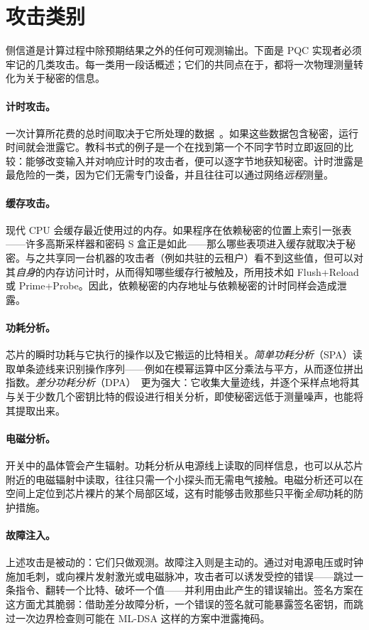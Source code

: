 \section{攻击类别}

侧信道是计算过程中除预期结果之外的任何可观测输出。下面是 PQC 实现者必须牢记的几类攻击。每一类用一段话概述；它们的共同点在于，都将一次物理测量转化为关于秘密的信息。

\paragraph{计时攻击。}
一次计算所花费的总时间取决于它所处理的数据~\cite{kocher1996}。如果这些数据包含秘密，运行时间就会泄露它。教科书式的例子是一个在找到第一个不同字节时立即返回的比较：能够改变输入并对响应计时的攻击者，便可以逐字节地获知秘密。计时泄露是最危险的一类，因为它们无需专门设备，并且往往可以通过网络\emph{远程}测量。

\paragraph{缓存攻击。}
现代 CPU 会缓存最近使用过的内存。如果程序在依赖秘密的位置上索引一张表——许多高斯采样器和密码 S 盒正是如此——那么哪些表项进入缓存就取决于秘密。与之共享同一台机器的攻击者（例如共驻的云租户）看不到这些值，但可以对其\emph{自身}的内存访问计时，从而得知哪些缓存行被触及，所用技术如 Flush+Reload 或 Prime+Probe。因此，依赖秘密的内存地址与依赖秘密的计时同样会造成泄露。

\paragraph{功耗分析。}
芯片的瞬时功耗与它执行的操作以及它搬运的比特相关。\emph{简单功耗分析}（SPA）读取单条迹线来识别操作序列——例如在模幂运算中区分乘法与平方，从而逐位拼出指数。\emph{差分功耗分析}（DPA）~\cite{kjj1999}更为强大：它收集大量迹线，并逐个采样点地将其与关于少数几个密钥比特的假设进行相关分析，即使秘密远低于测量噪声，也能将其提取出来。

\paragraph{电磁分析。}
开关中的晶体管会产生辐射。功耗分析从电源线上读取的同样信息，也可以从芯片附近的电磁辐射中读取，往往只需一个小探头而无需电气接触。电磁分析还可以在空间上定位到芯片裸片的某个局部区域，这有时能够击败那些只平衡\emph{全局}功耗的防护措施。

\paragraph{故障注入。}
上述攻击是被动的：它们只做观测。故障注入则是主动的。通过对电源电压或时钟施加毛刺，或向裸片发射激光或电磁脉冲，攻击者可以诱发受控的错误——跳过一条指令、翻转一个比特、破坏一个值——并利用由此产生的错误输出。签名方案在这方面尤其脆弱：借助差分故障分析，一个错误的签名就可能暴露签名密钥，而跳过一次边界检查则可能在 ML-DSA 这样的方案中泄露掩码。

